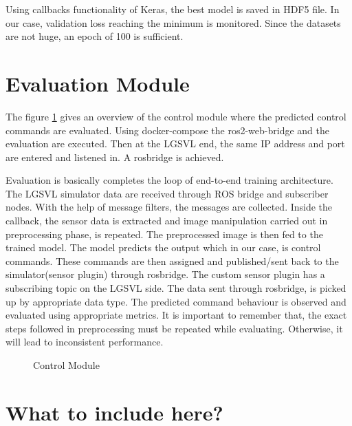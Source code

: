 Using callbacks functionality of Keras, the best model is saved in HDF5 file. In our case, validation
loss  reaching the minimum is monitored. Since the datasets are not huge, an epoch of 100
is sufficient.
\fi
\section{Evaluation Module}
The figure \ref{fig:evaluationfigure} gives an overview of the control module where the
predicted control commands are evaluated.
Using docker-compose the ros2-web-bridge and the evaluation are executed. Then at the
LGSVL end, the same IP address and port are entered and listened in. A rosbridge is
achieved.

Evaluation is basically completes the loop of end-to-end training architecture.  The LGSVL simulator data are received through ROS
bridge and subscriber nodes. With the help of message filters, the messages are collected.
Inside the callback, the sensor data is extracted and image manipulation carried out in preprocessing phase, is
repeated. The preprocessed image is then fed to the trained model. The model predicts the
output which in our case, is control commands. These commands are then assigned and published/sent
back to the simulator(sensor plugin) through rosbridge. The custom sensor plugin has a subscribing topic on the
LGSVL side. The data sent through rosbridge, is picked up by appropriate data type. The predicted command behaviour is observed and
evaluated using appropriate metrics. It is important to remember that, the exact steps followed
in preprocessing must be repeated while evaluating. Otherwise, it will lead to inconsistent
performance.

\begin{figure}
	\centering
    \def\svgwidth{1.05\textwidth}
    \caption{Control Module}
    \label{fig:evaluationfigure}
\end{figure}

\iffalse
\section{What to include here?}

